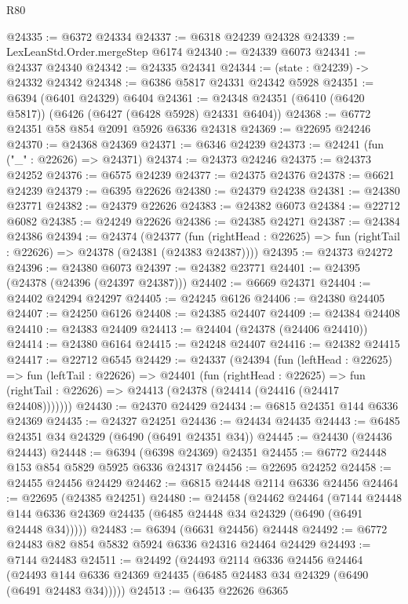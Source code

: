 \begin{lexlean}{R80}
\begin{coremodule}
@24335 := @6372 @24334
@24337 := @6318 @24239 @24328
@24339 := LexLeanStd.Order.mergeStep @6174
@24340 := @24339 @6073
@24341 := @24337 @24340
@24342 := @24335 @24341
@24344 := (state : @24239) -> @24332 @24342
@24348 := @6386 @5817 @24331 @24342 @5928
@24351 := @6394 (@6401 @24329) @6404
@24361 := @24348 @24351 (@6410 (@6420 @5817)) (@6426 (@6427 (@6428 @5928) @24331 @6404))
@24368 := @6772 @24351 @58 @854 @2091 @5926 @6336 @24318
@24369 := @22695 @24246
@24370 := @24368 @24369
@24371 := @6346 @24239
@24373 := @24241 (fun ("_" : @22626) => @24371)
@24374 := @24373 @24246
@24375 := @24373 @24252
@24376 := @6575 @24239
@24377 := @24375 @24376
@24378 := @6621 @24239
@24379 := @6395 @22626
@24380 := @24379 @24238
@24381 := @24380 @23771
@24382 := @24379 @22626
@24383 := @24382 @6073
@24384 := @22712 @6082
@24385 := @24249 @22626
@24386 := @24385 @24271
@24387 := @24384 @24386
@24394 := @24374
    (@24377
      (fun (rightHead : @22625) => fun (rightTail : @22626) => @24378 (@24381 (@24383 @24387))))
@24395 := @24373 @24272
@24396 := @24380 @6073
@24397 := @24382 @23771
@24401 := @24395 (@24378 (@24396 (@24397 @24387)))
@24402 := @6669 @24371
@24404 := @24402 @24294 @24297
@24405 := @24245 @6126
@24406 := @24380 @24405
@24407 := @24250 @6126
@24408 := @24385 @24407
@24409 := @24384 @24408
@24410 := @24383 @24409
@24413 := @24404 (@24378 (@24406 @24410))
@24414 := @24380 @6164
@24415 := @24248 @24407
@24416 := @24382 @24415
@24417 := @22712 @6545
@24429 := @24337
    (@24394
      (fun (leftHead : @22625) =>
      fun (leftTail : @22626) =>
      @24401
        (fun (rightHead : @22625) =>
        fun (rightTail : @22626) => @24413 (@24378 (@24414 (@24416 (@24417 @24408)))))))
@24430 := @24370 @24429
@24434 := @6815 @24351 @144 @6336 @24369
@24435 := @24327 @24251
@24436 := @24434 @24435
@24443 := @6485 @24351 @34 @24329 (@6490 (@6491 @24351 @34))
@24445 := @24430 (@24436 @24443)
@24448 := @6394 (@6398 @24369) @24351
@24455 := @6772 @24448 @153 @854 @5829 @5925 @6336 @24317
@24456 := @22695 @24252
@24458 := @24455 @24456 @24429
@24462 := @6815 @24448 @2114 @6336 @24456
@24464 := @22695 (@24385 @24251)
@24480 := @24458
    (@24462
      @24464
      (@7144 @24448 @144 @6336 @24369 @24435 (@6485 @24448 @34 @24329 (@6490 (@6491 @24448 @34)))))
@24483 := @6394 (@6631 @24456) @24448
@24492 := @6772 @24483 @82 @854 @5832 @5924 @6336 @24316 @24464 @24429
@24493 := @7144 @24483
@24511 := @24492
    (@24493
      @2114
      @6336
      @24456
      @24464
      (@24493 @144 @6336 @24369 @24435 (@6485 @24483 @34 @24329 (@6490 (@6491 @24483 @34)))))
@24513 := @6435 @22626 @6365

\end{coremodule}
\end{lexlean}
